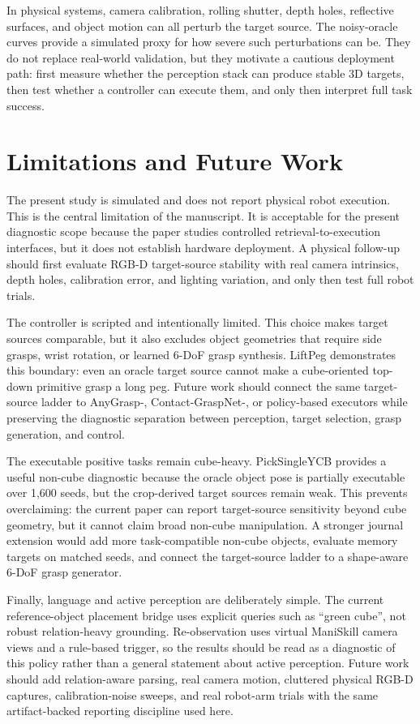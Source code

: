\documentclass[preprint,12pt]{elsarticle}
\begin{document}
In physical systems, camera calibration, rolling shutter, depth holes,
reflective surfaces, and object motion can all perturb the target source. The
noisy-oracle curves provide a simulated proxy for how severe such perturbations
can be. They do not replace real-world validation, but they motivate a cautious
deployment path: first measure whether the perception stack can produce stable
3D targets, then test whether a controller can execute them, and only then
interpret full task success.

\section{Limitations and Future Work}

The present study is simulated and does not report physical robot execution.
This is the central limitation of the manuscript. It is acceptable for the
present diagnostic scope because the paper studies controlled
retrieval-to-execution interfaces, but it does not establish hardware
deployment. A physical follow-up should first evaluate RGB-D target-source
stability with real camera intrinsics, depth holes, calibration error, and
lighting variation, and only then test full robot trials.

The controller is scripted and intentionally limited. This choice makes target
sources comparable, but it also excludes object geometries that require side
grasps, wrist rotation, or learned 6-DoF grasp synthesis. LiftPeg demonstrates
this boundary: even an oracle target source cannot make a cube-oriented
top-down primitive grasp a long peg. Future work should connect the same
target-source ladder to AnyGrasp-, Contact-GraspNet-, or policy-based
executors while preserving the diagnostic separation between perception,
target selection, grasp generation, and control.

The executable positive tasks remain cube-heavy. PickSingleYCB provides a
useful non-cube diagnostic because the oracle object pose is partially
executable over 1,600 seeds, but the crop-derived target sources remain weak.
This prevents overclaiming: the current paper can report target-source
sensitivity beyond cube geometry, but it cannot claim broad non-cube
manipulation. A stronger journal extension would add more task-compatible
non-cube objects, evaluate memory targets on matched seeds, and connect the
target-source ladder to a shape-aware 6-DoF grasp generator.

Finally, language and active perception are deliberately simple. The current
reference-object placement bridge uses explicit queries such as ``green
cube'', not robust relation-heavy grounding. Re-observation uses virtual
ManiSkill camera views and a rule-based trigger, so the results should be read
as a diagnostic of this policy rather than a general statement about active
perception. Future work should add relation-aware parsing, real camera motion,
cluttered physical RGB-D captures, calibration-noise sweeps, and real robot-arm
trials with the same artifact-backed reporting discipline used here.
\end{document}
